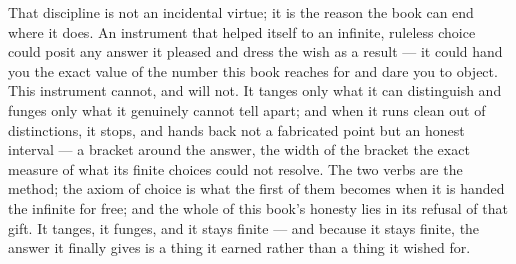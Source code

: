 That discipline is not an incidental virtue; it is the reason the book can end where it does. An instrument that
helped itself to an infinite, ruleless choice could posit any answer it pleased and dress the wish as a result --- it
could hand you the exact value of the number this book reaches for and dare you to object. This instrument cannot, and
will not. It tanges only what it can distinguish and funges only what it genuinely cannot tell apart; and when it runs
clean out of distinctions, it stops, and hands back not a fabricated point but an honest interval --- a bracket around
the answer, the width of the bracket the exact measure of what its finite choices could not resolve. The two verbs are
the method; the axiom of choice is what the first of them becomes when it is handed the infinite for free; and the
whole of this book's honesty lies in its refusal of that gift. It tanges, it funges, and it stays finite --- and
because it stays finite, the answer it finally gives is a thing it earned rather than a thing it wished for.
